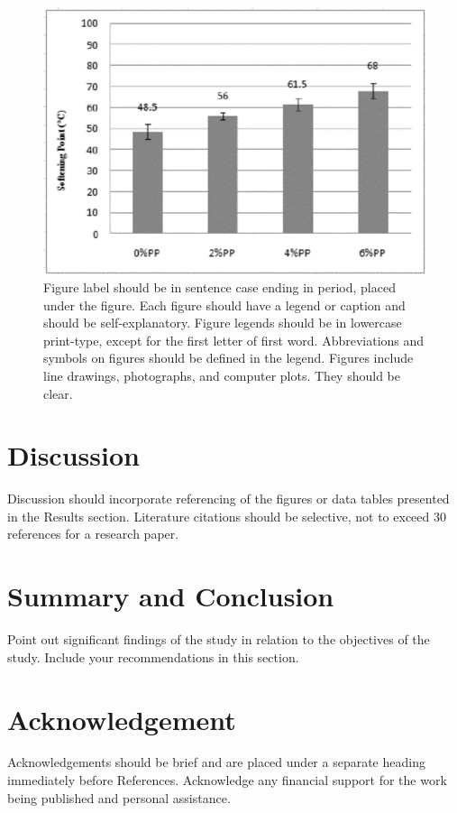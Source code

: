 \documentclass{strrespaper-journ}
\begin{document}
	        \begin{figure}[htbp]
	            \centering
	            \includegraphics[width=\linewidth]{../sample/graphics/bar_graph}
	            \caption{
					Figure label should be in sentence case ending in period, placed under the figure.
					Each figure should have a legend or caption and should be self-explanatory.
					Figure legends should be in lowercase print-type, except for the first letter of first word.
					Abbreviations and symbols on figures should be defined in the legend.
					Figures include line drawings, photographs, and computer plots.
					They should be clear.
				}
	            \label{fig:bar_graph}
	        \end{figure}

    \section{Discussion}
		Discussion should incorporate referencing of the figures or data tables presented in the Results section.
		Literature citations should be selective, not to exceed 30 references for a research paper.

    \section{Summary and Conclusion}
		Point out significant findings of the study in relation to the objectives of the study.
		Include your recommendations in this section.

    \section{Acknowledgement}
		Acknowledgements should be brief and are placed under a separate heading immediately before References.
		Acknowledge any financial support for the work being published and personal assistance.
\end{document}
